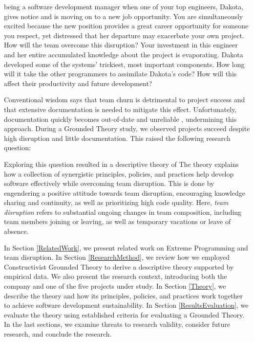  being a software development manager when one of your top engineers, Dakota, gives notice and is moving on to a new job opportunity. You are simultaneously excited because the new position provides a great career opportunity for someone you respect, yet distressed that her departure may exacerbate your own project. How will the team overcome this disruption? Your investment in this engineer and her entire accumulated knowledge about the project is evaporating. Dakota developed some of the systems' trickiest, most important components. How long will it take the other programmers to assimilate Dakota's code?  How will this affect their productivity and future development?


Conventional wisdom says that team churn is detrimental to project success and that extensive documentation is needed to mitigate this effect. Unfortunately, documentation quickly becomes out-of-date and unreliable \cite{Lethbridge2003Documentation}, undermining this approach. During a Grounded Theory study, we observed projects succeed despite high disruption and little documentation. This raised the following research question: 

Exploring this question resulted in a descriptive theory of  The theory explains how a collection of synergistic principles, policies, and practices help develop software effectively while overcoming team disruption. This is done by engendering a positive attitude towards team disruption, encouraging knowledge sharing and continuity, as well as prioritizing high code quality. Here, \textit{team disruption} refers to substantial ongoing changes in team composition, including team members joining or leaving, as well as temporary vacations or leave of absence. 

In Section \ref{RelatedWork}, we present related work on Extreme Programming and team disruption. In Section \ref{ResearchMethod}, we review how we employed Constructivist Grounded Theory to derive a descriptive theory supported by empirical data. We also present the research context, introducing both the company and one of the five projects under study. In Section \ref{Theory}, we describe the theory and how its principles, policies, and practices work together to achieve software development sustainability. In Section \ref{ResultsEvaluation}, we evaluate the theory using established criteria for evaluating a Grounded Theory. In the last sections, we examine threats to research validity, consider future research, and conclude the research.
